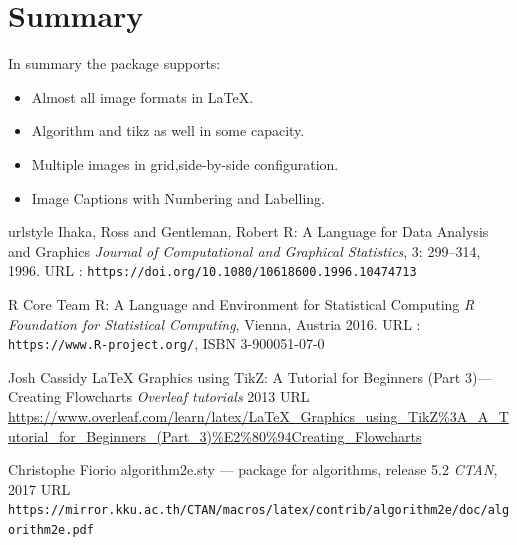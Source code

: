 \section{Summary}

In summary the  package supports:
\begin{itemize}
\item Almost all image formats in LaTeX.
\item Algorithm and tikz as well in some capacity.
\item Multiple images in grid,side-by-side configuration.
\item Image Captions with Numbering and Labelling.
\end{itemize}

\begin{thebibliography}{20}
    \providecommand{\natexlab}[1]{#1}
    \providecommand{\url}[1]{\texttt{#1}}
    \expandafter\ifx\csname urlstyle\endcsname\relax
      \providecommand{\doi}[1]{doi: #1}\else
      \providecommand{\doi}{doi: \begingroup \urlstyle{rm}\Url}\fi
{}
Ihaka, Ross and Gentleman, Robert
\newblock R: A Language for Data Analysis and Graphics
\newblock \emph{Journal of Computational and Graphical Statistics}, 3:
299--314, 1996.
\newblock URL : \url{https://doi.org/10.1080/10618600.1996.10474713}

R Core Team
\newblock R: A Language and Environment for Statistical Computing
\newblock \emph{R Foundation for Statistical Computing}, Vienna, Austria  2016.
\newblock URL : \url{https://www.R-project.org/}, ISBN 3-900051-07-0

Josh Cassidy
\newblock LaTeX Graphics using TikZ: A Tutorial for Beginners (Part 3)—Creating Flowcharts
\newblock \emph{Overleaf tutorials} 2013
\newblock URL \url{https://www.overleaf.com/learn/latex/LaTeX_Graphics_using_TikZ%3A_A_Tutorial_for_Beginners_(Part_3)%E2%80%94Creating_Flowcharts}

Christophe Fiorio
\newblock algorithm2e.sty — package for algorithms, release 5.2
\newblock \emph{CTAN}, 2017
\newblock URL \url{https://mirror.kku.ac.th/CTAN/macros/latex/contrib/algorithm2e/doc/algorithm2e.pdf}
\end{thebibliography}

\address{%
Abhishek Ulayil\\
Student, Institute of Actuaries of India\\%
Mumbai, India\\
ORCiD: 0009-0000-6935-8690\\
}

